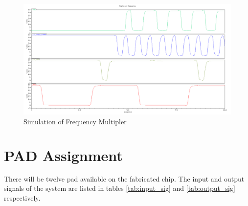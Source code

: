 \documentclass[a4paper,12pt]{article} \usepackage{graphicx}
\begin{document}
\begin{figure}[p]
        \centering
        \includegraphics[width=\textwidth]{../Bilder/freq_mult_signals.png}
        \caption{Simulation of Frequency Multipler}
        \label{fig:freq_mult_signals}
\end{figure}
\clearpage
\section{PAD Assignment} %
There will be twelve pad available on the fabricated chip. The input and output
signals of the system are listed in tables \ref{tab:input_sig} and
\ref{tab:output_sig} respectively. 
\end{document}

